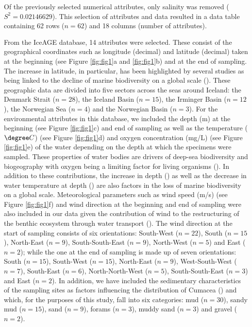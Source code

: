 Of the previously selected numerical attributes, only salinity was removed (\( S^2 = 0.02146629 \)). This selection of attributes and data resulted in a data table containing 62 rows (\( n=62 \)) and 18 columns (number of attributes). 

From the IceAGE database, 14 attributes were selected. These consist of the geographical coordinates such as longitude (decimal) and latitude (decimal) taken at the beginning (see Figure \ref{fig:fig1}a and \ref{fig:fig1}b) and at the end of sampling. The increase in latitude, in particular, has been highlighted by several studies as being linked to the decline of marine biodiversity on a global scale (\cite{lambshead_latitudinal_2000, gage_diversity_2004}). These geographic data are divided into five sectors across the seas around Iceland: the Denmark Strait (\( n=28 \)), the Iceland Basin (\( n=15 \)), the Irminger Basin (\( n=12 \)), the Norwegian Sea (\( n=4 \)) and the Norwegian Basin (\( n=3 \)). For the environmental attributes in this database, we included the depth (m) at the beginning (see Figure \ref{fig:fig1}c) and end of sampling as well as the temperature (\( \degree C \)) (see Figure \ref{fig:fig1}d) and oxygen concentration (mg/L) (see Figure \ref{fig:fig1}e) of the water depending on the depth at which the specimens were sampled. These properties of water bodies are drivers of deep-sea biodiversity and biogeography with oxygen being a limiting factor for living organisms (\cite{keeling_ocean_2010}). In addition to these contributions, the increase in depth (\cite{rex_global_2006, costello_marine_2017}) as well as the decrease in water temperature at depth (\cite{lambshead_latitudinal_2000}) are also factors in the loss of marine biodiversity on a global scale. Meteorological parameters such as wind speed (m/s) (see Figure \ref{fig:fig1}f) and wind direction at the beginning and end of sampling were also included in our data given the contribution of wind to the restructuring of the benthic ecosystem through water transport (\cite{waga_recent_2020, saeedi_environmental_2022}). The wind direction at the start of sampling consists of six orientations: South-West (\( n=22 \)), South (\( n=15 \)), North-East (\( n=9 \)), South-South-East (\( n=9 \)), North-West (\( n=5 \)) and East (\( n=2 \)); while the one at the end of sampling is made up of seven orientations: South (\( n=15 \)), South-West (\( n=15 \)), North-East (\( n=9 \)), West-South-West (\( n=7 \)), South-East (\( n=6 \)), North-North-West (\( n=5 \)), South-South-East (\( n=3 \)) and East (\( n=2 \)). In addition, we have included the sedimentary characteristics of the sampling sites as factors influencing the distribution of Cumacea (\cite{uhlir_adding_2021}) and which, for the purposes of this study, fall into six categories: mud (\( n=30 \)), sandy mud (\( n=15 \)), sand (\( n=9 \)), forams (\( n=3 \)), muddy sand (\( n=3 \)) and gravel (\( n=2 \)).

